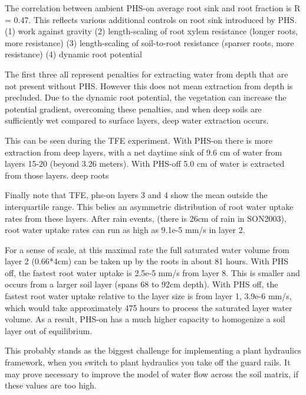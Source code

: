 \documentclass[draft,linenumbers]{agujournal}
\begin{document}
The correlation between ambient PHS-on average root sink and root fraction is R = 0.47.
This reflects various additional controls on root sink introduced by PHS.
(1) work against gravity
(2) length-scaling of root xylem resistance (longer roots, more resistance)
(3) length-scaling of soil-to-root resistance (sparser roots, more resistance)
(4) dynamic root potential

The first three all represent penalties for extracting water from depth that are not present without PHS.
However this does not mean extraction from depth is precluded.
Due to the dynamic root potential, the vegetation can increase the potential gradient, overcoming these penalties,  
and when deep soils are sufficiently wet compared to surface layers, deep water extraction occurs.

This can be seen during the TFE experiment. With PHS-on there is more extraction from deep layers, 
with a net daytime sink of 9.6 cm of water from layers 15-20 (beyond 3.26 meters). 
With PHS-off  5.0 cm of water is extracted from those layers.
deep roots \citep{nepstad1994}

Finally note that TFE, phs-on layers 3 and 4 show the mean outside the interquartile range. 
This belies an asymmetric distribution of root water uptake rates from these layers.
After rain events, (there is 26cm of rain in SON2003), root water uptake rates can run as high as 9.1e-5 mm/s in layer 2.

For a sense of scale, at this maximal rate the full saturated water volume from layer 2 (0.66*4cm) can be taken up by the roots in about 81 hours.
With PHS off, the fastest root water uptake is 2.5e-5 mm/s from layer 8. This is smaller and occurs from a larger soil layer (spans 68 to 92cm depth).
With PHS off, the fastest root water uptake relative to the layer size is from layer 1, 3.9e-6 mm/s, 
which would take approximately 475 hours to process the saturated layer water volume. 
As a result, PHS-on has a much higher capacity to homogenize a soil layer out of equilibrium. 

This probably stands as the biggest challenge for implementing a plant hydraulics framework, 
when you switch to plant hydraulics you take off the guard rails. 
It may prove necessary to improve the model of water flow across the soil matrix, if these values are too high.
\end{document}
